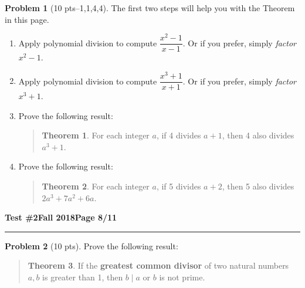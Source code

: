 \documentclass[11pt]{article}
\theoremstyle{definition}
\newtheorem{problem}{Problem}
\theoremstyle{theorem}
\newtheorem*{theorem}{Theorem}
\begin{document}
\bigskip
\begin{problem}[10 pts--1,1,4,4]
  The first two steps will help you with the Theorem in this page.
  \begin{enumerate}
  \item Apply polynomial division to compute $\dfrac{x^2-1}{x-1}$.  Or if you prefer, simply \emph{factor} $x^2-1$.
    \vspace{2cm}
  \item Apply polynomial division to compute $\dfrac{x^3+1}{x+1}$.  Or if you prefer, simply \emph{factor} $x^3+1$.
    \vspace{3cm}
  \item Prove the following result:
    \vspace{-0.75cm}
    \begin{quotation}
      \begin{theorem}
        For each integer $a$, if 4 divides $a+1$, then 4 also divides $a^3+1$.
      \end{theorem}
    \end{quotation}
    \vspace{3cm}
  \item Prove the following result:
    \vspace{-0.75cm}
    \begin{quotation}
      \begin{theorem}
        For each integer $a$, if 5 divides $a+2$, then 5 also divides $2a^3+7a^2+6a$.
      \end{theorem}
    \end{quotation}
  \end{enumerate}
\end{problem}
\newpage

\hfill{\large\bf Test \#2}\hfill{\large\bf Fall 2018}\hfill{\large\bf Page 8/11}\hrule

\bigskip
\begin{problem}[10 pts]
  Prove the following result:
  \vspace{-0.75cm}
  \begin{quotation}
    \begin{theorem}
      If the \textbf{greatest common divisor} of two natural numbers $a, b$ is greater than 1, then $b \mid a$ or $b$ is
      not prime.
    \end{theorem}
  \end{quotation}
\end{problem}
\newpage
\end{document}
